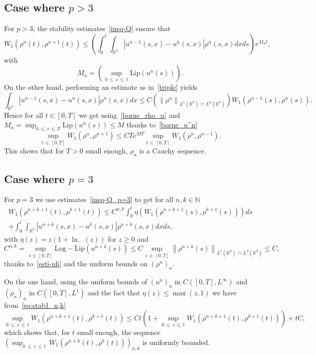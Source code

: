 \documentclass[10pt]{amsart}
\theoremstyle{definition}\newtheorem{defi}[theo]{Definition}\newtheorem{rema}[theo]{Remark}\newtheorem{exam}[theo]{Example}\newtheorem{exem}[theo]{Example}\newtheorem{nota}[theo]{Notation}
\newcommand{\Lip}{\mathrm{Lip}}
\newcommand{\LLip}{\mathrm{Log-Lip}}
\newcommand{\R}{\mathbb{R}}
\newcommand{\N}{\mathbb{N}}
\renewcommand{\leq}{\leqslant}
\renewcommand{\geq}{\geqslant}
\begin{document}
\subsection*{Case where \texorpdfstring{$p>3$}{p>3}} 

For $p>3$, the stability estimates~\eqref{ineq-Q} ensure that
\[
W_1\left(\rho^n(t),\rho^{n+1}(t)\right)\leq \left(\int_0^t \int_{\R^3}\left|u^{n-1}(s,x)-u^{n}(s,x)\right|\rho^{n}(s,x)dx ds \right)e^{M_n t},
\]
with
\[
M_n=\left(\mathop{\sup}_{0\,\leq\,s\,\leq\,t}\Lip(u^n(s))\right).
\]
On the other hand, performing an estimate as in~\eqref{triple} yields
\[
\int_{\R^3}\left|u^{n-1}(s,x)-u^{n}(s,x)\right|\rho^{n}(s,x)dx\leq C\left(\left\|\rho^n\right\|_{L^1(\R^3)\,\cap\,L^p(\R^3)}\right)W_1\left(\rho^{n-1}(s),\rho^n(s)\right).
\]
Hence for all $t\in[0,T]$ we get using~\eqref{borne_rho_n} and $M_n={\sup}_{0\,\leq\,s\, \leq\,T}\Lip(u^n(s))\leq M$ thanks to~\eqref{borne_u^n}
\begin{equation*}
\underset{t\,\in\,[0,T]}{\sup} W_1\left(\rho^n,\rho^{n+1}\right)\leq C Te^{MT} \underset{t\,\in\,[0,T]}{\sup} W_1\left(\rho^n,\rho^{n-1}\right).
\end{equation*}
This shows that for $T>0$ small enough, $\rho_n$ is a Cauchy sequence.

\subsection*{Case where \texorpdfstring{$p=3$}{p=3}} For $p=3$ we use estimates~\eqref{ineq-Q_p=3} to get for all $n,k\in \N$
\begin{multline}\label{eq:stab1_n,k}
W_1\left(\rho^{n+k+1}(t),\rho^{k+1}(t)\right) \leq C^{n,k} \int_0^t \eta \left(W_1\left(\rho^{n+k+1}(s),\rho^{k+1}(s)\right) \right) ds\\
+ \int_0^t \int_{\R^3} \left|u^{n+k}(s,x)-u^{k}(s,x)\right|\rho^{n+k}(s,x) dx ds,
\end{multline}
with $\eta(z)=z(1+\ln_{-}(z)) $ for $z\geq 0$ and
\[
C^{n,k}=\underset{s\,\in\,[0,T]}{\sup}\LLip\left(u^{n+k}(s)\right) \leq C \underset{s\,\in\,[0,T]}{\sup}\left\| \rho^{n+k}(s)\right\|_{L^1(\R^3)\,\cap\,L^3(\R^3)} \leq C,
\]
thanks to~\eqref{esti-uli} and the uniform bounds on $(\rho^n)_{n}$.

On the one hand, using the uniform bounds of $(u^n)_n$ in $ C([0,T],L^\infty)$ and $(\rho_n)_n$ in $ C([0,T],L^{1})$ and the fact that $\eta(z)\leq \max(z,1) $ we have from~\eqref{eq:stab1_n,k}
\[
\underset{0\,\leq\,s\,\leq\,t}{\sup} W_1\left(\rho^{n+k+1}(t),\rho^{k+1}(t)\right) \leq C t \left(1+ \underset{0\,\leq\,s\,\leq\,t}{\sup}W_1\left(\rho^{n+k+1}(t),\rho^{k+1}(t)\right) \right) + t C,
\]
which shows that, for $t$ small enough, the sequence $({\sup}_{0\,\leq\,s\,\leq\,t}\,W_1(\rho^{n+k}(t),\rho^{k}(t)))_{n,k}$ is uniformly bounded.
\end{document}
